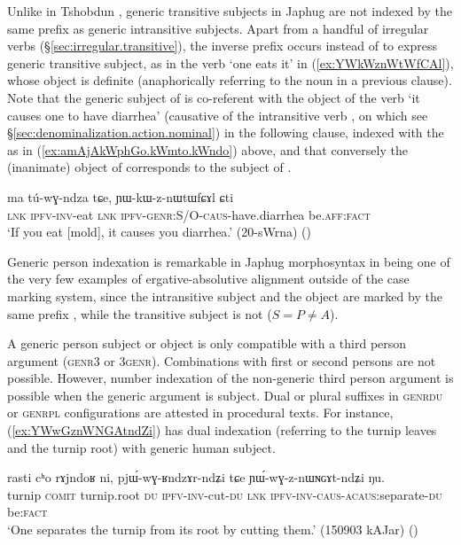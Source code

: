 Unlike in Tshobdun \citep{sun14generic}, generic transitive subjects in Japhug are not indexed by the same prefix as generic intransitive subjects. Apart from a handful of irregular verbs (§\ref{sec:irregular.transitive}), the inverse prefix  occurs instead of  to express generic transitive subject, as in the verb  `one eats it' in (\ref{ex:YWkWznWtWfCAl}), whose object is definite (anaphorically referring to the noun  in a previous clause). Note that the generic subject of  is co-referent with the object of the verb   `it causes one to have diarrhea' (causative of the intransitive verb , on which see §\ref{sec:denominalization.action.nominal}) in the following clause, indexed with the  as in (\ref{ex:amAjAkWphGo.kWmto.kWndo}) above, and that conversely the (inanimate) object of  corresponds to the subject of .

\begin{exe}
\ex   \label{ex:YWkWznWtWfCAl}
\gll  ma tú-wɣ-ndza tɕe, ɲɯ-kɯ-z-nɯtɯfɕɤl ɕti\\
\textsc{lnk} \textsc{ipfv}-\textsc{inv}-eat \textsc{lnk} \textsc{ipfv}-\textsc{genr}:S/O-\textsc{caus}-have.diarrhea be.\textsc{aff}:\textsc{fact}\\
\glt `If you eat [mold], it causes you diarrhea.' (20-sWrna) ()
\end{exe}

Generic person indexation is remarkable in Japhug morphosyntax in being one of the very few examples of ergative-absolutive alignment outside of the case marking system, since the intransitive subject and the object are marked by the same prefix , while the transitive subject is not ($S=P \ne A$).

A generic person subject or object is only compatible with a third person argument (\textsc{genr}\fl{}3 or 3\fl{}\textsc{genr}). Combinations with first or second persons are not possible. However, number indexation of the non-generic third person argument is possible when the generic argument is subject. Dual or plural suffixes in \textsc{genr}\fl{}\textsc{du} or \textsc{genr}\fl{}\textsc{pl} configurations are attested in procedural texts. For instance, (\ref{ex:YWwGznWNGAtndZi}) has dual indexation (referring to the turnip leaves and the turnip root) with generic human subject.

\begin{exe}
\ex \label{ex:YWwGznWNGAtndZi}
\gll rasti cʰo rɤjndoʁ ni, pjɯ́-wɣ-ʁndzɤr-ndʑi tɕe ɲɯ́-wɣ-z-nɯɴɢɤt-ndʑi ŋu. \\
turnip \textsc{comit} turnip.root \textsc{du} \textsc{ipfv}-\textsc{inv}-cut-\textsc{du} \textsc{lnk} \textsc{ipfv}-\textsc{inv}-\textsc{caus}-\textsc{acaus}:separate-\textsc{du} be:\textsc{fact}\\
\glt `One separates the turnip from its root by cutting them.' (150903 kAJar)
()
\end{exe}


